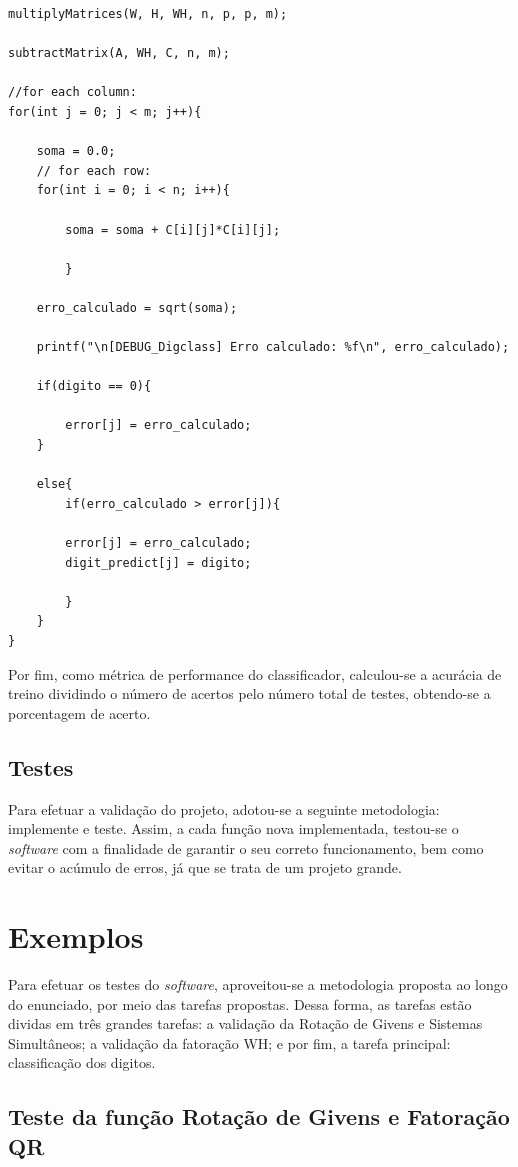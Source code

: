 \documentclass[twocolumn,amsmath,amssymb,floatfix]{revtex4}
\begin{document}
\begin{lstlisting}
multiplyMatrices(W, H, WH, n, p, p, m);

subtractMatrix(A, WH, C, n, m);

//for each column:
for(int j = 0; j < m; j++){

	soma = 0.0;
	// for each row:
	for(int i = 0; i < n; i++){

		soma = soma + C[i][j]*C[i][j];

		}

	erro_calculado = sqrt(soma);

	printf("\n[DEBUG_Digclass] Erro calculado: %f\n", erro_calculado);

	if(digito == 0){

		error[j] = erro_calculado;
	}

	else{
		if(erro_calculado > error[j]){

		error[j] = erro_calculado;
		digit_predict[j] = digito;

		}
	}
}
\end{lstlisting}

Por fim, como métrica de performance do classificador, calculou-se a acurácia de treino dividindo o número de acertos pelo número total de testes, obtendo-se a porcentagem de acerto.

\subsection{Testes}

Para efetuar a validação do projeto, adotou-se a seguinte metodologia: implemente e teste. Assim, a cada função nova implementada, testou-se o \textit{software} com a finalidade de garantir o seu correto funcionamento, bem como evitar o acúmulo de erros, já que se trata de um projeto grande.

\section{Exemplos} 

Para efetuar os testes do \textit{software}, aproveitou-se a metodologia proposta ao longo do enunciado, por meio das tarefas propostas. Dessa forma, as tarefas estão dividas em três grandes tarefas: a validação da Rotação de Givens e Sistemas Simultâneos; a validação da fatoração WH; e por fim, a tarefa principal: classificação dos digitos. 

\subsection{Teste da função Rotação de Givens e Fatoração QR}
\end{document}
